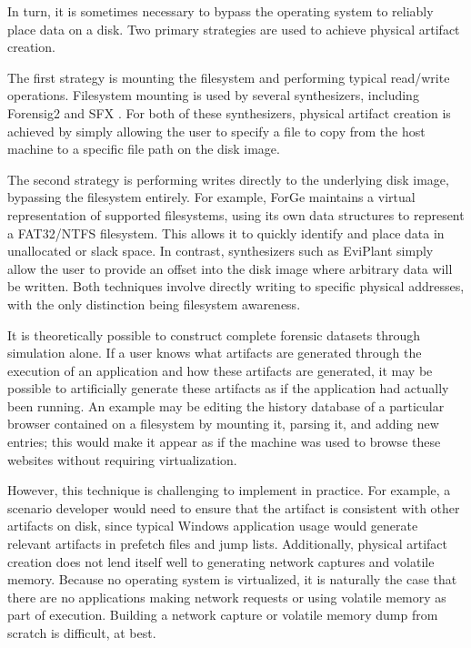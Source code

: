 \documentclass[letterpaper,12pt]{report}
\begin{document}
In turn, it is sometimes necessary to bypass the operating system to
reliably place data on a disk. Two primary strategies are used to
achieve physical artifact creation.

The first strategy is mounting the filesystem and performing typical
read/write operations. Filesystem mounting is used by several
synthesizers, including Forensig2
\cite{mochForensicImageGenerator2009} and SFX
\cite{russellForensicImageDescription2012}. For both of these
synthesizers, physical artifact creation is achieved by simply allowing
the user to specify a file to copy from the host machine to a specific
file path on the disk image.

The second strategy is performing writes directly to the underlying disk
image, bypassing the filesystem entirely. For example, ForGe
\cite{vistiAutomaticCreationComputer2015} maintains a virtual
representation of supported filesystems, using its own data structures
to represent a FAT32/NTFS filesystem. This allows it to quickly identify
and place data in unallocated or slack space. In contrast, synthesizers
such as EviPlant \cite{scanlonEviPlantEfficientDigital2017} simply
allow the user to provide an offset into the disk image where arbitrary
data will be written. Both techniques involve directly writing to
specific physical addresses, with the only distinction being filesystem
awareness.

It is theoretically possible to construct complete forensic datasets
through simulation alone. If a user knows what artifacts are generated
through the execution of an application and how these artifacts are
generated, it may be possible to artificially generate these artifacts
as if the application had actually been running. An example may be
editing the history database of a particular browser contained on a
filesystem by mounting it, parsing it, and adding new entries; this
would make it appear as if the machine was used to browse these websites
without requiring virtualization.

However, this technique is challenging to implement in practice. For
example, a scenario developer would need to ensure that the artifact is
consistent with other artifacts on disk, since typical Windows
application usage would generate relevant artifacts in prefetch files
and jump lists. Additionally, physical artifact creation does not lend
itself well to generating network captures and volatile memory. Because
no operating system is virtualized, it is naturally the case that there
are no applications making network requests or using volatile memory as
part of execution. Building a network capture or volatile memory dump
from scratch is difficult, at best.
\end{document}
